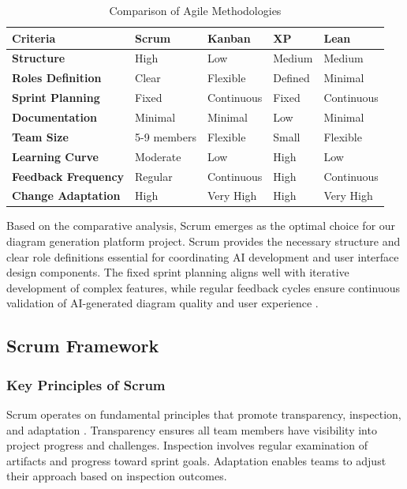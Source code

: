 \begin{table}[htbp]
\centering
\caption{Comparison of Agile Methodologies}
\label{tab:agile_comparison}
\begin{tabular}{|p{2cm}|p{2.5cm}|p{2.5cm}|p{2.5cm}|p{2.5cm}|}
\hline
\textbf{Criteria} & \textbf{Scrum} & \textbf{Kanban} & \textbf{XP} & \textbf{Lean} \\
\hline
\textbf{Structure} & High & Low & Medium & Medium \\
\hline
\textbf{Roles Definition} & Clear & Flexible & Defined & Minimal \\
\hline
\textbf{Sprint Planning} & Fixed & Continuous & Fixed & Continuous \\
\hline
\textbf{Documentation} & Minimal & Minimal & Low & Minimal \\
\hline
\textbf{Team Size} & 5-9 members & Flexible & Small & Flexible \\
\hline
\textbf{Learning Curve} & Moderate & Low & High & Low \\
\hline
\textbf{Feedback Frequency} & Regular & Continuous & High & Continuous \\
\hline
\textbf{Change Adaptation} & High & Very High & High & Very High \\
\hline
\end{tabular}
\end{table}

Based on the comparative analysis, Scrum emerges as the optimal choice for our diagram generation platform project. Scrum provides the necessary structure and clear role definitions essential for coordinating AI development and user interface design components. The fixed sprint planning aligns well with iterative development of complex features, while regular feedback cycles ensure continuous validation of AI-generated diagram quality and user experience \cite{scrum_advantages}.

\subsection{Scrum Framework}

\subsubsection{Key Principles of Scrum}

Scrum operates on fundamental principles that promote transparency, inspection, and adaptation \cite{scrum_guide}. Transparency ensures all team members have visibility into project progress and challenges. Inspection involves regular examination of artifacts and progress toward sprint goals. Adaptation enables teams to adjust their approach based on inspection outcomes.

